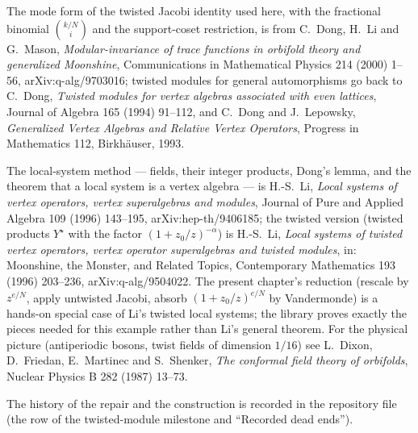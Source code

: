 The mode form of the twisted Jacobi identity used here, with the fractional binomial
$\binom{k/N}{i}$ and the support-coset restriction, is from C.~Dong, H.~Li and G.~Mason,
\emph{Modular-invariance of trace functions in orbifold theory and generalized Moonshine},
Communications in Mathematical Physics 214 (2000) 1--56, arXiv:q-alg/9703016; twisted modules
for general automorphisms go back to C.~Dong, \emph{Twisted modules for vertex algebras
associated with even lattices}, Journal of Algebra 165 (1994) 91--112, and C.~Dong and
J.~Lepowsky, \emph{Generalized Vertex Algebras and Relative Vertex Operators}, Progress in
Mathematics 112, Birkh\"auser, 1993.

The local-system method --- fields, their integer products, Dong's lemma, and the theorem that a
local system is a vertex algebra --- is H.-S.~Li, \emph{Local systems of vertex operators, vertex
superalgebras and modules}, Journal of Pure and Applied Algebra 109 (1996) 143--195,
arXiv:hep-th/9406185; the twisted version (twisted products $Y^\star$ with the factor
$(1+z_0/z)^{-\alpha}$) is H.-S.~Li, \emph{Local systems of twisted vertex operators, vertex
operator superalgebras and twisted modules}, in: Moonshine, the Monster, and Related Topics,
Contemporary Mathematics 193 (1996) 203--236, arXiv:q-alg/9504022. The present chapter's
reduction (rescale by $z^{e/N}$, apply untwisted Jacobi, absorb $(1+z_0/z)^{e/N}$ by
Vandermonde) is a hands-on special case of Li's twisted local systems; the library proves exactly
the pieces needed for this example rather than Li's general theorem. For the physical picture
(antiperiodic bosons, twist fields of dimension $1/16$) see L.~Dixon, D.~Friedan, E.~Martinec and
S.~Shenker, \emph{The conformal field theory of orbifolds}, Nuclear Physics B 282 (1987) 13--73.

The history of the repair and the construction is recorded in the repository file
 (the row of the twisted-module milestone
and ``Recorded dead ends'').
